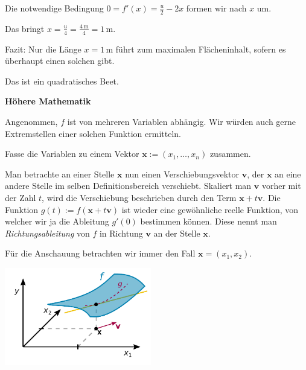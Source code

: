\documentclass[9pt]{beamer}
\newcommand{\unit}[1]{\mathrm{#1}}
\newcommand{\strong}[1]{\textsf{\textbf{#1}}}
\begin{document}
\begin{frame}
Die notwendige Bedingung $0=f'(x)=\tfrac{u}{2}-2x$ formen wir nach
$x$ um.\pause

\vspace{0.8em}
Das bringt $x = \tfrac{u}{4} = \tfrac{4\,\unit{m}}{4} = 1\,\unit{m}$.
\pause

\vspace{0.8em}
Fazit: Nur die Länge $x = 1\,\unit{m}$ führt zum maximalen
Flächeninhalt, sofern es überhaupt einen solchen gibt.

\vspace{0.8em}
Das ist ein quadratisches Beet.
\end{frame}

\begin{frame}
\begin{center}
\strong{Höhere Mathematik}
\end{center}
\end{frame}

\begin{frame}
Angenommen, $f$ ist von mehreren Variablen abhängig. Wir würden
auch gerne Extremstellen einer solchen Funktion ermitteln.
\end{frame}

\begin{frame}
Fasse die Variablen zu einem Vektor
$\mathbf x:=(x_1,\ldots,x_n)$
zusammen.\pause

\vspace{0.8em}
Man betrachte an einer Stelle $\mathbf x$ nun einen Verschiebungsvektor
$\mathbf v$, der $\mathbf x$ an eine andere Stelle im selben
Definitionsbereich verschiebt. Skaliert man $\mathbf v$ vorher
mit der Zahl $t$, wird die Verschiebung beschrieben durch den Term
$\mathbf x+t\mathbf v$. Die Funktion
$g(t):=f(\mathbf x+t\mathbf v)$ ist wieder
eine gewöhnliche reelle Funktion, von welcher wir ja die Ableitung
$g'(0)$ bestimmen können. Diese nennt man \emph{Richtungsableitung}
von $f$ in Richtung $\mathbf v$ an der Stelle $\mathbf x$.
\end{frame}

\begin{frame}[t]
\vspace{4em}
Für die Anschauung betrachten wir immer den Fall
$\mathbf x = (x_1,x_2)$.
\pause

\vspace{0.5em}
\begin{center}
\includegraphics[width=64mm]{img/Richtungsableitung.pdf}
\end{center}
\end{frame}
\end{document}
